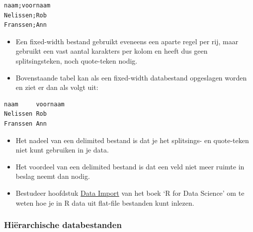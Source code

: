 \documentclass[]{tufte-book}
\providecommand{\tightlist}{%
  \setlength{\itemsep}{0pt}\setlength{\parskip}{0pt}}
\begin{document}
\begin{verbatim}
naam;voornaam
Nelissen;Rob
Franssen;Ann
\end{verbatim}

\begin{itemize}
\tightlist
\item
  Een fixed-width bestand gebruikt eveneens een aparte regel per rij, maar gebruikt een vast aantal karakters per kolom en heeft dus geen splitsingsteken, noch quote-teken nodig.
\item
  Bovenstaande tabel kan als een fixed-width databestand opgeslagen worden en ziet er dan als volgt uit:
\end{itemize}

\begin{verbatim}
naam     voornaam
Nelissen Rob
Franssen Ann
\end{verbatim}

\begin{itemize}
\tightlist
\item
  Het nadeel van een delimited bestand is dat je het splitsings- en quote-teken niet kunt gebruiken in je data.
\item
  Het voordeel van een delimited bestand is dat een veld niet meer ruimte in beslag neemt dan nodig.
\item
  Bestudeer hoofdstuk \href{http://r4ds.had.co.nz/data-import.html}{Data Import} van het boek `R for Data Science' om te weten hoe je in R data uit flat-file bestanden kunt inlezen.
\end{itemize}

\hypertarget{hiuxebrarchische-databestanden}{%
\subsubsection{Hiërarchische databestanden}\label{hiuxebrarchische-databestanden}}
\end{document}

